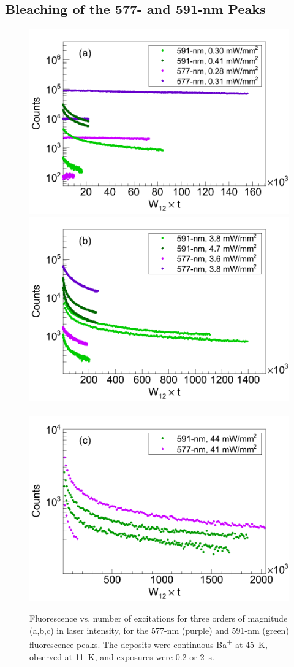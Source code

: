 \subsection{Bleaching of the 577- and 591-nm Peaks}
\label{sec:bleach577and591}

\begin{figure} %
        \centering
                \includegraphics[width=.5\textwidth]{figures/bleach_compareEmission577vs591_specificSigmas_a.png}
                \includegraphics[width=.5\textwidth]{figures/bleach_compareEmission577vs591_specificSigmas_b.png}
                ~
                \includegraphics[width=.5\textwidth]{figures/bleach_compareEmission577vs591_specificSigmas_c.png}
                \caption{Fluorescence vs. number of excitations for three orders of magnitude (a,b,c) in laser intensity, for the 577-nm (purple) and 591-nm (green) fluorescence peaks.  The deposits were continuous Ba\textsuperscript{+} at 45~K, observed at 11~K, and exposures were 0.2 or 2~s.}
\label{fig:bleach_577vs591}
\end{figure}

